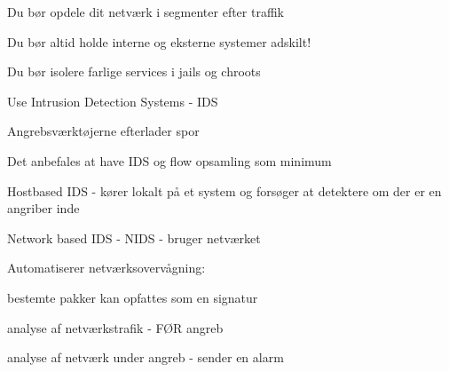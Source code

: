 \documentclass[Screen16to9,17pt]{foils}
\begin{document}


\begin{list1}
\item Du bør opdele dit netværk i segmenter efter traffik
\item Du bør altid holde interne og eksterne systemer adskilt!
\item Du bør isolere farlige services i jails og chroots
\end{list1}




\begin{list1}
\item Use Intrusion Detection Systems - IDS
\item Angrebsværktøjerne efterlader spor
\item Det anbefales at have IDS og flow opsamling som minimum
\item Hostbased IDS - kører lokalt på et system og forsøger at
  detektere om der er en angriber inde
\item Network based IDS - NIDS - bruger netværket
\item Automatiserer netværksovervågning:
  \begin{list2}
  \item bestemte pakker kan opfattes som en signatur
\item analyse af netværkstrafik - FØR angreb
\item analyse af netværk under angreb - sender en alarm
  \end{list2}
\end{list1}


\end{document}
